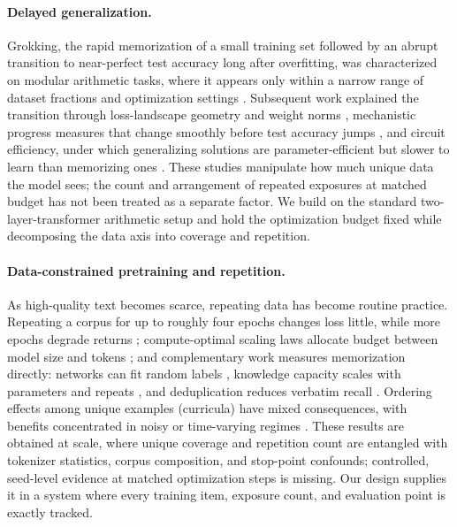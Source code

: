 \documentclass[10pt]{article}
\begin{document}
\paragraph{Delayed generalization.}
Grokking, the rapid memorization of a small training set followed by an abrupt transition to near-perfect test accuracy long after overfitting, was characterized on modular arithmetic tasks, where it appears only within a narrow range of dataset fractions and optimization settings \citep{power2022grokking}. Subsequent work explained the transition through loss-landscape geometry and weight norms \citep{liu2023omnigrok}, mechanistic progress measures that change smoothly before test accuracy jumps \citep{nanda2024progress}, and circuit efficiency, under which generalizing solutions are parameter-efficient but slower to learn than memorizing ones \citep{varma2024explaining}. These studies manipulate how much unique data the model sees; the count and arrangement of repeated exposures at matched budget has not been treated as a separate factor. We build on the standard two-layer-transformer arithmetic setup \citep{power2022grokking, nanda2024progress} and hold the optimization budget fixed while decomposing the data axis into coverage and repetition.

\paragraph{Data-constrained pretraining and repetition.}
As high-quality text becomes scarce, repeating data has become routine practice. Repeating a corpus for up to roughly four epochs changes loss little, while more epochs degrade returns \citep{muennighoff2023scaling}; compute-optimal scaling laws allocate budget between model size and tokens \citep{kaplan2020scaling, hoffmann2022training}; and complementary work measures memorization directly: networks can fit random labels \citep{zhang2017understanding}, knowledge capacity scales with parameters and repeats \citep{allen-zhu2024physics}, and deduplication reduces verbatim recall \citep{lee2022deduplicating}. Ordering effects among unique examples (curricula) have mixed consequences, with benefits concentrated in noisy or time-varying regimes \citep{wu2021curricula, bengio2009curriculum}. These results are obtained at scale, where unique coverage and repetition count are entangled with tokenizer statistics, corpus composition, and stop-point confounds; controlled, seed-level evidence at matched optimization steps is missing. Our design supplies it in a system where every training item, exposure count, and evaluation point is exactly tracked.
\end{document}
